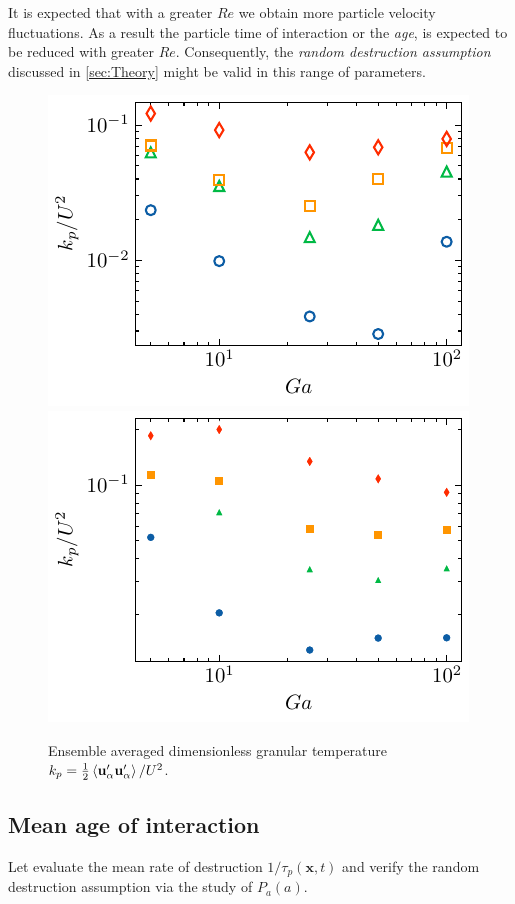 It is expected that with a greater $Re$ we obtain more particle velocity fluctuations. 
As a result the particle time of interaction or the \textit{age}, is expected to be reduced with greater $Re$. 
Consequently, the \textit{random destruction assumption} discussed in \ref{sec:Theory} might be valid in this range of parameters. 
\begin{figure}[h!]
    \centering
    \includegraphics[height = 0.3\textwidth]{image/HOMOGENEOUS_NEW/PA/Talpha_l_1.pdf}
    \includegraphics[height = 0.3\textwidth]{image/HOMOGENEOUS_NEW/PA/Talpha_l_10.pdf}
    \caption{
        Ensemble averaged dimensionless granular temperature $k_p = \frac{1}{2}\left<\textbf{u}'_\alpha \textbf{u}_\alpha'\right>/U^2$.     
    }
    \label{fig:Reall}
\end{figure}

\subsection{Mean age of interaction}

Let evaluate the mean rate of destruction $1/\tau_p(\textbf{x},t)$ and verify the random destruction assumption via the study of $P_a(a)$.  


